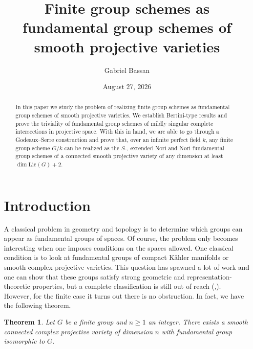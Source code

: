 \documentclass[a4paper,12pt]{amsart}
\title[Finite group schemes as fundamental group schemes]{Finite group schemes as fundamental group schemes of smooth projective varieties}
\author{Gabriel Bassan}
\date{August 27, 2026}
\newtheorem*{theorem2}{Theorem}
\numberwithin{equation}{section}
\renewcommand{\geq}{\geqslant}
\renewcommand{\_}{\rule{0.25cm}{0.4pt}}
\begin{document}
\begin{abstract}
In this paper we study the problem of realizing finite group schemes as fundamental group schemes of smooth projective varieties. We establish Bertini-type results and prove the triviality of fundamental group schemes of mildly singular complete intersections in projective space. With this in hand, we are able to go through a Godeaux--Serre construction and prove that, over an infinite perfect field $k$, any finite group scheme $G/k$ can be realized as the $S$-, extended Nori and Nori fundamental group schemes of a connected smooth projective variety of any dimension at least $\dim \text{Lie}(G)+2$.
\end{abstract}

\maketitle

\section*{Introduction}
A classical problem in geometry and topology is to determine which groups can appear as fundamental groups of spaces. Of course, the problem only becomes interesting when one imposes conditions on the spaces allowed. One classical condition is to look at fundamental groups of compact Kähler manifolds or smooth complex projective varieties. This question has spawned a lot of work and one can show that these groups satisfy strong geometric and representation-theoretic properties, but a complete classification is still out of reach (\cite{Amoros1996-im},\cite{Py25}). However, for the finite case it turns out there is no obstruction. In fact, we have the following theorem.

\begin{theorem2}\cite[Proposition 15]{Serre1958Topology}
Let $G$ be a finite group and $n\geq 1$ an integer. There exists a smooth connected complex projective variety of dimension $n$ with fundamental group isomorphic to $G$.
\end{theorem2}
\end{document}
